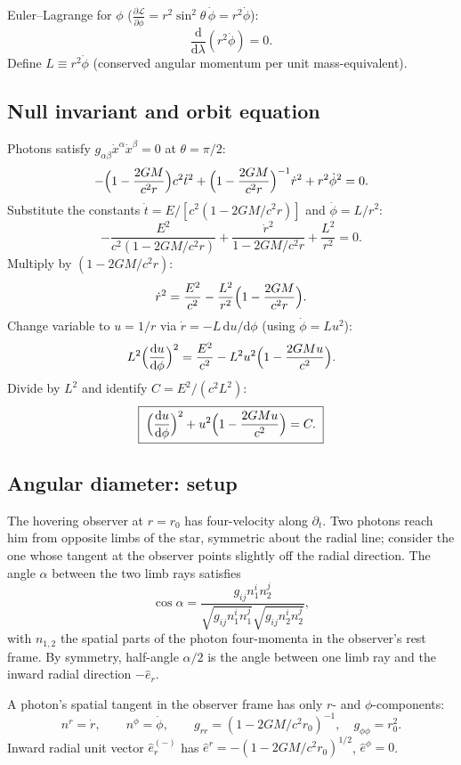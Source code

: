 \documentclass[11pt]{article}
\newcommand{\de}{\mathrm{d}}
\newcommand{\pd}[2]{\frac{\partial #1}{\partial #2}}
\begin{document}
Euler--Lagrange for $\phi$ ($\pd{\mathcal L}{\dot\phi}=r^{2}\sin^{2}\theta\,\dot\phi=r^{2}\dot\phi$):
\[ \boxed{\;\frac{\de}{\de\lambda}(r^{2}\dot\phi) = 0.\;} \]
Define $L\equiv r^{2}\dot\phi$ (conserved angular momentum per unit mass-equivalent).

\subsection*{Null invariant and orbit equation}

Photons satisfy $g_{\alpha\beta}\dot x^{\alpha}\dot x^{\beta}=0$ at $\theta=\pi/2$:
\[ -\Bigl(1-\frac{2GM}{c^{2}r}\Bigr)c^{2}\dot t^{2} + \Bigl(1-\frac{2GM}{c^{2}r}\Bigr)^{-1}\dot r^{2} + r^{2}\dot\phi^{2} = 0. \]
Substitute the constants $\dot t=E/[c^{2}(1-2GM/c^{2}r)]$ and $\dot\phi=L/r^{2}$:
\[ -\frac{E^{2}}{c^{2}(1-2GM/c^{2}r)} + \frac{\dot r^{2}}{1-2GM/c^{2}r} + \frac{L^{2}}{r^{2}} = 0. \]
Multiply by $(1-2GM/c^{2}r)$:
\[ \dot r^{2} = \frac{E^{2}}{c^{2}} - \frac{L^{2}}{r^{2}}\Bigl(1-\frac{2GM}{c^{2}r}\Bigr). \]
Change variable to $u=1/r$ via $\dot r = -L\,\de u/\de\phi$ (using $\dot\phi=Lu^{2}$):
\[ L^{2}\Bigl(\frac{\de u}{\de\phi}\Bigr)^{2} = \frac{E^{2}}{c^{2}} - L^{2}u^{2}\Bigl(1-\frac{2GM u}{c^{2}}\Bigr). \]
Divide by $L^{2}$ and identify $C=E^{2}/(c^{2}L^{2})$:
\[ \boxed{\;\Bigl(\frac{\de u}{\de\phi}\Bigr)^{2} + u^{2}\Bigl(1-\frac{2GM u}{c^{2}}\Bigr) = C.\;}\label{eq:orbit} \]

\subsection*{Angular diameter: setup}

The hovering observer at $r=r_{0}$ has four-velocity along $\partial_{t}$. Two photons reach him from opposite limbs of the star, symmetric about the radial line; consider the one whose tangent at the observer points slightly off the radial direction. The angle $\alpha$ between the two limb rays satisfies
\[ \cos\alpha = \frac{g_{ij}n_{1}^{i}n_{2}^{j}}{\sqrt{g_{ij}n_{1}^{i}n_{1}^{j}}\sqrt{g_{ij}n_{2}^{i}n_{2}^{j}}}, \]
with $n_{1,2}$ the spatial parts of the photon four-momenta in the observer's rest frame. By symmetry, half-angle $\alpha/2$ is the angle between one limb ray and the inward radial direction $-\hat e_{r}$.

A photon's spatial tangent in the observer frame has only $r$- and $\phi$-components:
\[ n^{r}=\dot r,\qquad n^{\phi}=\dot\phi,\qquad g_{rr}=(1-2GM/c^{2}r_{0})^{-1},\quad g_{\phi\phi}=r_{0}^{2}. \]
Inward radial unit vector $\hat e_{r}^{(-)}$ has $\hat e^{r}=-(1-2GM/c^{2}r_{0})^{1/2}$, $\hat e^{\phi}=0$.
\end{document}

